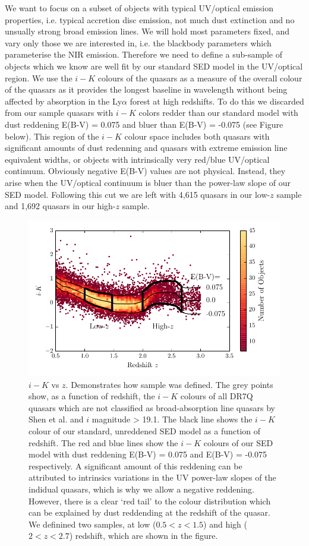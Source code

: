 We want to focus on a subset of objects with typical UV/optical emission properties, i.e. typical accretion disc emission, not much dust extinction and no unsually strong broad emission lines. 
We will hold most parameters fixed, and vary only those we are interested in, i.e. the blackbody parameters which parameterise the NIR emission. 
Therefore we need to define a sub-sample of objects which we know are well fit by our standard SED model in the UV/optical region. 
We use the $i-K$ colours of the quasars as a measure of the overall colour of the quasars as it provides the longest baseline in wavelength without being affected by absorption in the Ly$\alpha$ forest at high redshifts. 
To do this we discarded from our sample quasars with $i - K$ colors redder than our standard model with dust reddening E(B-V) = 0.075 and bluer than E(B-V) = -0.075 (see Figure below). 
This region of the $i-K$ colour space includes both quasars with significant amounts of dust redenning and quasars with extreme emission line equivalent widths, or objects with intrinsically very red/blue UV/optical continuum. Obviously negative E(B-V) values are not physical. 
Instead, they arise when the UV/optical continuum is bluer than the power-law slope of our SED model. 
Following this cut we are left with 4,615 quasars in our low-$z$ sample and 1,692 quasars in our high-$z$ sample. 

\begin{figure}
  \centering
  \includegraphics[width=\columnwidth]{figures/chapter06/ik_versus_z_low_ext.pdf}
  \caption{$i-K$ vs $z$. Demonstrates how sample was defined. The grey points show, as a function of redshift, the $i-K$ colours of all DR7Q quasars which are not classified as broad-absorption line quasars by Shen et al. and $i$ magnitude > 19.1. The black line shows the $i-K$ colour of our standard, unreddened SED model as a function of redshift. The red and blue lines show the $i-K$ colours of our SED model with dust reddening E(B-V) = 0.075 and E(B-V) = -0.075 respectively. A significant amount of this reddening can be attributed to intrinsics variations in the UV power-law slopes of the indidual quasars, which is why we allow a negative reddening. However, there is a clear `red tail' to the colour distribution which can be explained by dust reddending at the redshift of the quasar. We definined two samples, at low ($0.5 < z < 1.5$) and high ($2 < z < 2.7$) redshift, which are shown in the figure.}
  \label{fig:ikzplot}
\end{figure}


